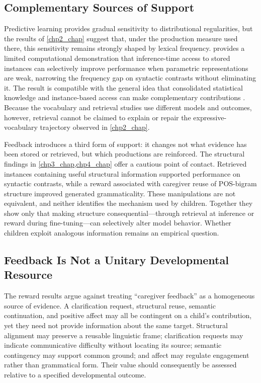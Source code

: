 \subsection{Complementary Sources of Support}

Predictive learning provides gradual sensitivity to distributional regularities, but the results of \cref{chp2_chap} suggest that, under the production measure used there, this sensitivity remains strongly shaped by lexical frequency.  provides a limited computational demonstration that inference-time access to stored instances can selectively improve performance when parametric representations are weak, narrowing the frequency gap on syntactic contrasts without eliminating it. The result is compatible with the general idea that consolidated statistical knowledge and instance-based access can make complementary contributions \citep{mcclelland1995there,kumaran2016learning}. Because the vocabulary and retrieval studies use different models and outcomes, however, retrieval cannot be claimed to explain or repair the expressive-vocabulary trajectory observed in \cref{chp2_chap}.

Feedback introduces a third form of support: it changes not what evidence has been stored or retrieved, but which productions are reinforced. The structural findings in \cref{chp3_chap,chp4_chap} offer a cautious point of contact. Retrieved instances containing useful structural information supported performance on syntactic contrasts, while a reward associated with caregiver reuse of POS-bigram structure improved generated grammaticality. These manipulations are not equivalent, and neither identifies the mechanism used by children. Together they show only that making structure consequential---through retrieval at inference or reward during fine-tuning---can selectively alter model behavior. Whether children exploit analogous information remains an empirical question.

\subsection{Feedback Is Not a Unitary Developmental Resource}

The reward results argue against treating ``caregiver feedback'' as a homogeneous source of evidence. A clarification request, structural reuse, semantic continuation, and positive affect may all be contingent on a child's contribution, yet they need not provide information about the same target. Structural alignment may preserve a reusable linguistic frame; clarification requests may indicate communicative difficulty without locating its source; semantic contingency may support common ground; and affect may regulate engagement rather than grammatical form. Their value should consequently be assessed relative to a specified developmental outcome.


